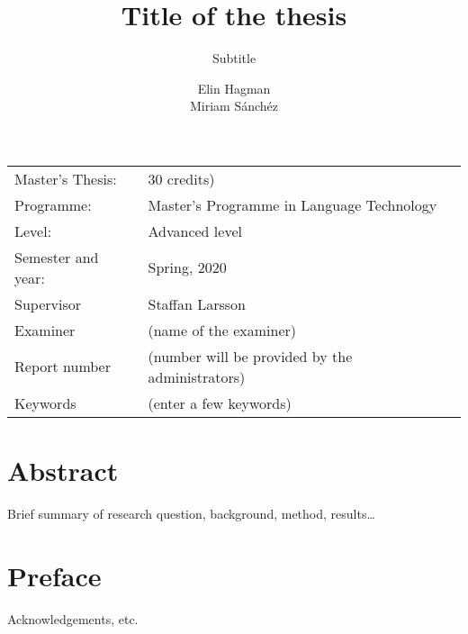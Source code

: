 \documentclass[11pt, a4paper]{article}
\title{Title of the thesis}
\subtitle{Subtitle}
\author{Elin Hagman \\ Miriam Sánchéz}
\begin{document}
\begin{titlepage}

\maketitle

\vfill

\begingroup
\renewcommand*{\arraystretch}{1.2}
\begin{tabular}{l@{\hskip 20mm}l}
\hline
Master's Thesis: & 30 credits)\\
Programme: & Master’s Programme in Language Technology\\
Level: & Advanced level \\
Semester and year: & Spring, 2020\\
Supervisor & Staffan Larsson\\
Examiner & (name of the examiner)\\
Report number & (number will be provided by the administrators) \\
Keywords & (enter a few keywords) 
\end{tabular}
\endgroup

\thispagestyle{empty}
\end{titlepage}

\newpage
\singlespacing
\section*{Abstract}

Brief summary of research question, background, method, results\ldots

\thispagestyle{empty}

\newpage
\section*{Preface}

Acknowledgements, etc.

\thispagestyle{empty}
\end{document}
